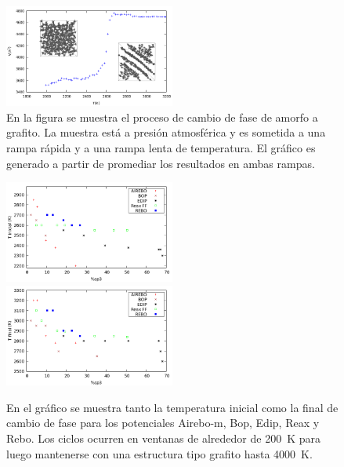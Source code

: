 \documentclass[aps,prl,twocolumn,superscriptaddress,groupedaddress]{revtex4}
\begin{document}
    \begin{figure}
        \includegraphics[width=0.5\textwidth]{melting.png}
        \caption{En la figura se muestra el proceso de cambio de fase de amorfo a grafito. La muestra está a presión atmosférica y es sometida a una rampa rápida y a una rampa lenta de temperatura. El gráfico es generado a partir de promediar los resultados en ambas rampas.}
        \label{fig:meltproc}
    \end{figure}
    \begin{figure}
        \includegraphics[width=0.5\textwidth]{datamelting.png}\\
        \includegraphics[width=0.5\textwidth]{datameltingfin.png}
        \caption{En el gráfico se muestra tanto la temperatura inicial como la final  de cambio de fase para los potenciales Airebo-m, Bop, Edip, Reax y Rebo. Los ciclos ocurren en ventanas de alrededor de 200~K para luego mantenerse con una estructura tipo grafito hasta 4000~K.}
        \label{fig:meltdata}
    \end{figure}
\end{document}

